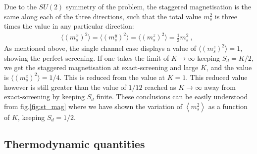\documentclass[reprint,onecolumn,prb,superscriptaddress]{revtex4-2}
\begin{document}
Due to the $SU(2)$ symmetry of the problem, the staggered magnetisation is the same along each of the three directions, such that the total value \(m_s^2\) is three times the value in any particular direction:
\begin{eqnarray}
\langle(m_s^x)^2\rangle=\langle(m_s^y)^2\rangle=\langle(m_s^z)^2\rangle=\frac{1}{3}m_s^2~,~~   
\end{eqnarray}
As mentioned above, the single channel case displays a value of $\langle (m_s^z)^2 \rangle =1$, showing the perfect screening. If one takes the limit of \(K \to \infty\) keeping \(S_d = K/2\), we get the staggered magnetisation at exact-screening and large \(K\), and the value is $\langle (m_s^z)^2 \rangle =1/4$. This is reduced from the value at \(K=1\). This reduced value however is still greater than the value of \(1/12\) reached as \(K\to \infty\) away from exact-screening by keeping \(S_d\) finite. These conclusions can be easily understood from fig.\ref{fig:st_mag} where we have shown the variation of \(\left<m_s^2 \right>\) as a function of \(K\), keeping \(S_d=1/2\).


\subsection{Thermodynamic quantities}
\end{document}
